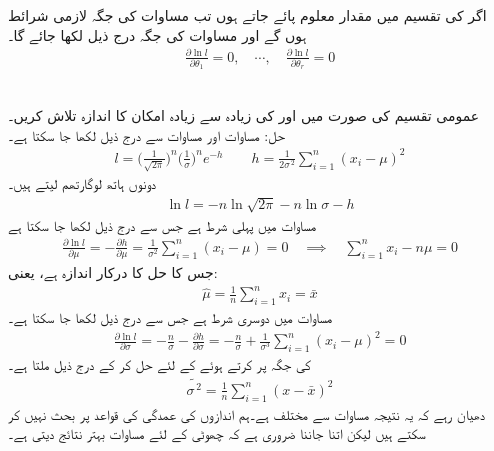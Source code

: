 اگر  کی تقسیم میں  مقدار معلوم  پائے جاتے ہوں تب مساوات  کی جگہ  لازمی شرائط  ہوں  گے اور مساوات  کی جگہ درج ذیل لکھا جائے گا۔ 
\begin{align}\label{مساوات_شماریات_زیادہ_سے_زیادہ_پ}
\frac{\partial \ln l}{\partial \theta_1}=0,\quad \cdots,\quad \frac{\partial \ln l}{\partial \theta_r}=0
\end{align}

\quad {}\\
عمومی تقسیم کی صورت میں  اور  کی زیادہ سے زیادہ امکان کا اندازہ تلاش کریں۔\\
حل:\quad
مساوات  اور  مساوات  سے درج ذیل لکھا جا سکتا ہے۔
\begin{align*}
l=\big(\frac{1}{\sqrt{2\pi}}\big)^n \big(\frac{1}{\sigma}\big)^n e^{-h}\quad \quad h=\frac{1}{2\sigma^{\,2}}\sum_{i=1}^{n}(x_i-\mu)^2
\end{align*}
دونوں ہاتھ لوگارتھم لیتے ہیں۔
\begin{align*}
\ln l=-n\ln \sqrt{2\pi}-n\ln \sigma-h
\end{align*} 
مساوات  میں پہلی شرط  ہے جس سے  درج ذیل لکھا جا سکتا ہے
\begin{align*}
\frac{\partial \ln l}{\partial \mu}=-\frac{\partial h}{\partial \mu}=\frac{1}{\sigma^2}\sum_{i=1}^{n}(x_i-\mu)=0\quad \implies \quad \sum_{i=1}^{n} x_i-n\mu=0
\end{align*}
جس کا حل  کا درکار اندازہ  ہے، یعنی:
\begin{align*}
\widehat{\mu}=\frac{1}{n}\sum_{i=1}^{n} x_i=\bar{x}
\end{align*} 
مساوات  میں دوسری شرط  ہے  جس سے  درج ذیل لکھا جا سکتا ہے۔
\begin{align*}
\frac{\partial \ln l}{\partial \sigma}=-\frac{n}{\sigma}-\frac{\partial h}{\partial \sigma}=-\frac{n}{\sigma}+\frac{1}{\sigma^3}\sum_{i=1}^{n} (x_i-\mu)^2=0
\end{align*}
 کی جگہ  پر کرتے ہوئے  کے لئے حل کر کے درج ذیل ملتا ہے۔
\begin{align*}
\widetilde{\sigma^{\,2}}=\frac{1}{n}\sum_{i=1}^{n} (x-\bar{x})^2
\end{align*}
دھیان رہے کہ یہ نتیجہ مساوات  سے مختلف ہے۔ہم اندازوں کی عمدگی کی قواعد پر بحث نہیں کر سکتے ہیں لیکن اتنا جاننا ضروری ہے کہ چھوٹی  کے لئے  مساوات  بہتر نتائج دیتی ہے۔



